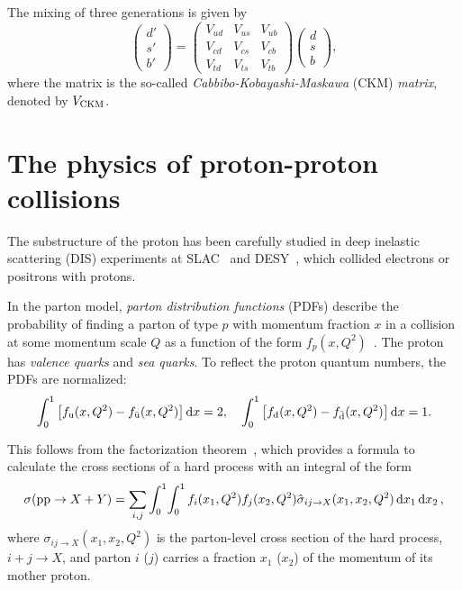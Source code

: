 The mixing of three generations is given by
\begin{equation} \label{eq:CKM_matrix}
  \begin{pmatrix}
     d' \\
     s' \\
     b'
  \end{pmatrix} = \begin{pmatrix}
     V_{ud} & V_{us} & V_{ub} \\
     V_{cd} & V_{cs} & V_{cb} \\
     V_{td} & V_{ts} & V_{tb}
  \end{pmatrix} \begin{pmatrix}
     d \\
     s \\
     b
  \end{pmatrix},
\end{equation}
where the matrix is the so-called \emph{Cabbibo-Kobayashi-Maskawa} (CKM) \emph{matrix}, denoted by $V_\mathrm{CKM}$.




\section{The physics of proton-proton collisions} \label{sec:pp_collisions}



The substructure of the proton has been carefully studied in deep inelastic scattering (DIS) experiments at SLAC~\cite{DIS_SLAC1,DIS_SLAC2} and DESY~\cite{DIS_HERA}, which collided electrons or positrons with protons.

In the parton model, \emph{parton distribution functions} (PDFs) describe the probability of finding a parton of type $p$ with momentum fraction $x$ in a collision at some momentum scale $Q$ as a function of the form $f_p(x,Q^2)$~\cite{parton_model1,parton_model2,parton_model_pp,pdfs,LHC_pdfs}.
The proton has \emph{valence quarks} and \emph{sea quarks}.
To reflect the proton quantum numbers, the PDFs are normalized:
\begin{equation}
  \int_0^1 \left[ f_{\text{u}}(x,Q^2) - f_{\bar{\text{u}}}(x,Q^2) \right] \dd{x} = 2, \quad
  \int_0^1 \left[ f_{\text{d}}(x,Q^2) - f_{\bar{\text{d}}}(x,Q^2) \right] \dd{x} = 1.
\end{equation}

This follows from the factorization theorem~\cite{PDF_factorization1,PDF_factorization2}, which provides a formula to calculate the cross sections of a hard process with an integral of the form
\begin{equation}
  \sigma(\mathrm{p}\mathrm{p}\to X + Y)
  = \sum_{i,j} \int_0^1\!\int_0^1 f_i(x_1,Q^2) f_j(x_2,Q^2) \hat\sigma_{ij\to X}(x_1,x_2,Q^2)\dd{x_1}\dd{x_2},
\end{equation}
where $\sigma_{ij\to X}(x_1,x_2,Q^2)$ is the parton-level cross section of the hard process, $i+j \to X$,
and parton $i$ ($j$) carries a fraction $x_1$ ($x_2$) of the momentum of its mother proton.




